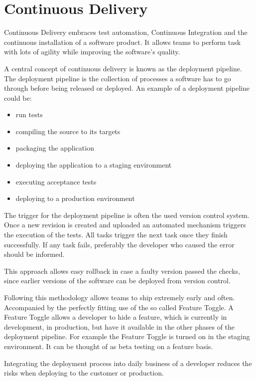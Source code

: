 \section{Continuous Delivery}

Continuous Delivery embraces test automation, Continuous Integration and the
continuous installation of a software product. It allows teams to perform task
with lots of agility while improving the software's quality.

A central concept of continuous delivery is known as the deployment pipeline.
The deployment pipeline is the collection of processes a software has to go
through before being released or deployed. An example of a deployment pipeline
could be: 

\begin{itemize}
  \item{run tests}
  \item{compiling the source to its targets}
  \item{packaging the application}
  \item{deploying the application to a staging environment}
  \item{executing acceptance tests}
  \item{deploying to a production environment}
\end{itemize}

The trigger for the deployment pipeline is often the used version control
system. Once a new revision is created and uploaded an automated mechanism
triggers the execution of the tests. All tasks trigger the next task once they
finish successfully. If any task fails, preferably the developer who caused the
error should be informed.

This approach allows easy rollback in case a faulty version passed the checks,
since earlier versions of the software can be deployed from version control.

Following this methodology allows teams to ship extremely early and often.
Accompanied by the perfectly fitting use of the so called Feature Toggle. A
Feature Toggle allows a developer to hide a feature, which is currently in
development, in production, but have it available in the other phases of the
deployment pipeline. For example the Feature Toggle is turned on in the staging
environment. It can be thought of as beta testing on a feature basis.

Integrating the deployment process into daily business of a developer reduces
the risks when deploying to the customer or production.

